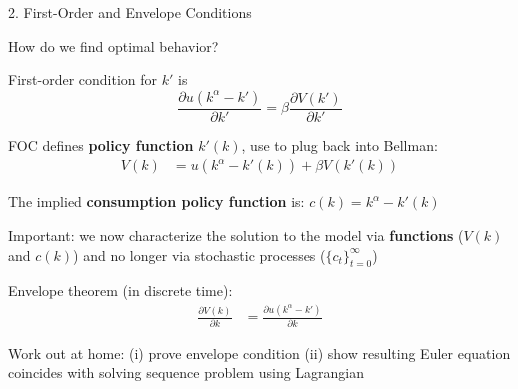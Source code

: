 \documentclass[11pt, aspectratio=169]{beamer}
\newenvironment{witemize}{\itemize\addtolength{\itemsep}{10pt}}{\enditemize}
\begin{document}
\begin{frame}{2. First-Order and Envelope Conditions}
\begin{witemize}
\item How do we find optimal behavior? 

\item First-order condition for $k'$ is
\begin{equation*}
	\frac{\partial u(k^\alpha - k')}{\partial k'} = \beta \frac{\partial V(k')}{\partial k'}
\end{equation*}

\item FOC defines \textbf{policy function} $k'(k)$, use to plug back into Bellman:
\begin{align*}
	V(k) &= u(k^\alpha  - k'(k)) + \beta V(k'(k))
\end{align*}

\item The implied \textbf{consumption policy function} is: $c(k) = k^\alpha - k'(k)$

\item Important: we now characterize the solution to the model via \textbf{functions} ($V(k)$ and $c(k)$) and no longer via stochastic processes ($\{c_t\}_{t = 0}^\infty$)
\end{witemize}
\end{frame}


\begin{frame}{}
\begin{witemize}
\item Envelope theorem (in discrete time):
\begin{align*}
	\frac{\partial V(k)}{\partial k} &= \frac{\partial u(k^\alpha - k')}{\partial k}
\end{align*}

\item Work out at home: (i) prove envelope condition (ii) show resulting Euler equation coincides with solving sequence problem using Lagrangian
\end{witemize}
\end{frame}
\end{document}
